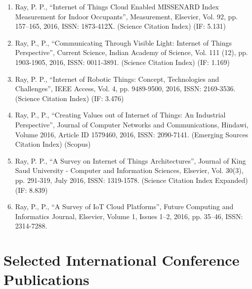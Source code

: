 \documentclass[11pt,a4paper]{moderncv}
\begin{document}
\begin{adjustwidth}{6em}{0pt}
\begin{enumerate}
		\item Ray, P. P., “Internet of Things Cloud Enabled MISSENARD Index Measurement for Indoor Occupants”, Measurement, Elsevier, Vol. 92, pp. 157–165, 2016, ISSN: 1873-412X. (Science Citation Index) (IF: 5.131)
		\item Ray, P., P., “Communicating Through Visible Light: Internet of Things Perspective”, Current Science, Indian Academy of Science, Vol. 111 (12), pp. 1903-1905, 2016, ISSN: 0011-3891. (Science Citation Index) (IF: 1.169)
		\item Ray, P. P., “Internet of Robotic Things: Concept, Technologies and Challenges”, IEEE Access, Vol. 4, pp. 9489-9500, 2016, ISSN: 2169-3536. (Science Citation Index) (IF: 3.476)
		\item Ray, P., P., “Creating Values out of Internet of Things: An Industrial Perspective”, Journal of Computer Networks and Communications, Hindawi, Volume 2016, Article ID 1579460, 2016, ISSN: 2090-7141. (Emerging Sources Citation Index) (Scopus)
		\item Ray, P. P., “A Survey on Internet of Things Architectures”, Journal of King Saud University - Computer and Information Sciences, Elsevier, Vol. 30(3), pp. 291-319, July 2016, ISSN: 1319-1578. (Science Citation Index Expanded) (IF: 8.839)
		\item Ray, P., P., “A Survey of IoT Cloud Platforms”, Future Computing and Informatics Journal, Elsevier, Volume 1, Issues 1–2, 2016, pp. 35–46, ISSN: 2314-7288.
		
	\end{enumerate}
\end{adjustwidth}



\section{\textbf{Selected International Conference Publications}}
\end{document}
